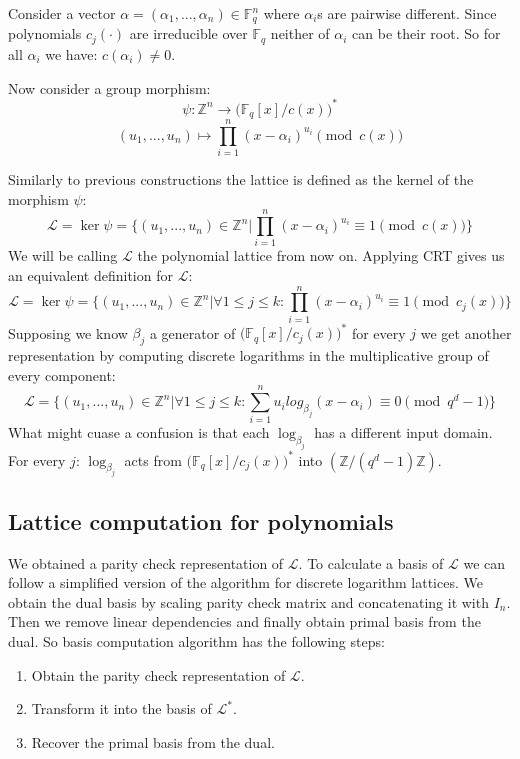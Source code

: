 \documentclass[12pt]{article}
\newcommand{\FF}{\mathbb{F}}
\newcommand{\ZZ}{\mathbb{Z}}
\newcommand{\LL}{\mathcal{L}}
\begin{document}
Consider a vector $\alpha = (\alpha_{1}, ... , \alpha_{n}) \in \FF_{q}^{n}$ where $\alpha_{i}$s are pairwise different. Since polynomials $c_{j}(\cdot)$ are irreducible over $\FF_{q}$ neither of $\alpha_{i}$ can be their root. So for all $\alpha_{i}$ we have: $c(\alpha_{i}) \neq 0$.

Now consider a group morphism:
\[
    \psi : \ZZ^{n} \rightarrow \big(\FF_{q}[x]/c(x)\big)^{*}
\]
\[
    (u_{1}, ..., u_{n}) \mapsto \prod_{i=1}^{n}(x - \alpha_{i})^{u_{i}} \pmod{c(x)}
\]

Similarly to previous constructions the lattice is defined as the kernel of the morphism $\psi$:
\[
    \LL = \ker \psi = \{(u_{1}, ..., u_{n}) \in \ZZ^{n} | \prod_{i=1}^{n}(x - \alpha_{i})^{u_{i}} \equiv 1 \pmod{c(x)}\}
\]
We will be calling $\LL$ the polynomial lattice from now on. Applying CRT gives us an equivalent definition for $\LL$:
\[
    \LL = \ker \psi = \{(u_{1}, ..., u_{n}) \in \ZZ^{n} |  \forall 1 \leq j \leq k: \prod_{i=1}^{n}(x - \alpha_{i})^{u_{i}} \equiv 1 \pmod{c_{j}(x)}\}
\]
Supposing we know $\beta_{j}$ a generator of $\big(\FF_{q}[x]/c_{j}(x)\big)^{*}$ for every $j$ we get another representation by computing discrete logarithms in the multiplicative group of every component:
\[
    \LL = \{(u_{1}, ..., u_{n}) \in \ZZ^{n} | \forall 1 \leq j \leq k: \sum_{i=1}^{n}u_{i}log_{\beta_{j}}(x - \alpha_{i}) \equiv 0 \pmod{q^{d} -1}\}
\]
What might cuase a confusion is that each $\log_{\beta_{j}}$ has a different input domain. For every $j$:  $\log_{\beta_{j}}$ acts from $\big(\FF_{q}[x]/c_{j}(x)\big)^{*}$ into $(\ZZ/(q^{d} - 1)\ZZ)$.


\subsection{Lattice computation for polynomials}
\label{subsec:compute_basis_polynomials}


We obtained a parity check representation of $\LL$.
To calculate a basis of $\LL$ we can follow a simplified version of the algorithm for discrete logarithm lattices. We obtain the dual basis by scaling parity check matrix and concatenating it with $I_{n}$. Then we remove linear dependencies and finally obtain primal basis from the dual. So basis computation algorithm has the following steps:

\begin{enumerate}
    \item \label{step1_p} Obtain the parity check representation of $\LL$.
    \item \label{step2_p} Transform it into the basis of $\LL^{*}$.
    \item \label{step3_p} Recover the primal basis from the dual.
\end{enumerate}
\end{document}
